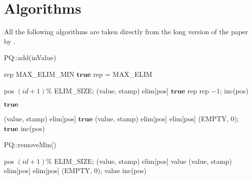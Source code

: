 
\section{Algorithms}

All the following algorithms are taken directly from the long version of the paper by \citeauthor{calciu_adaptive_2014-1} \cite{calciu_adaptive_2014-1}.

\begin{algorithm}[!htb]
	\caption{PQ::add(inValue)}
	\label{alg:add}
	\begin{algorithmic}[1]
		\State rep \attr MAX\_ELIM\_MIN
		\Else 
		\State \Return $\mathbf{true}$
		\EndIf
		\State rep = MAX\_ELIM
		\EndIf
		
		\State pos \attr $(id + 1) \% $ ELIM\_SIZE; (value, stamp) \attr 
		elim[pos]
		\State \Return $\mathbf{true}$
		\EndIf
		\EndIf
		\State rep \attr rep $- 1$; inc(pos)
		\EndWhile
		
		\State \Return $\mathbf{true}$
		\EndIf
		
		\State (value, stamp) \attr elim[pos]
		\State \Return $\mathbf{true}$
		\EndIf
		\EndIf
		\Repeat
		\State (value, stamp) \attr elim[pos]
		\State elim[pos] \attr (EMPTY, 0); \Return $\mathbf{true}$
		\EndIf    
		\EndIf
		\State inc(pos)
		\EndWhile
	\end{algorithmic}
\end{algorithm}

\begin{algorithm}[htb]
	\caption{PQ::removeMin()}
	\label{alg:removeMin}
	\begin{algorithmic}[1]
		\State pos \attr $(id + 1) \% $ ELIM\_SIZE; (value, stamp) \attr 
		elim[pos]
		\State \Return value
		\EndIf
		\EndIf
		\Repeat
		\State (value, stamp) \attr elim[pos]
		\State elim[pos] \attr (EMPTY, 0); \Return value
		\EndIf    
		\EndIf
		\State inc(pos)
		\EndWhile
	\end{algorithmic}
\end{algorithm}


